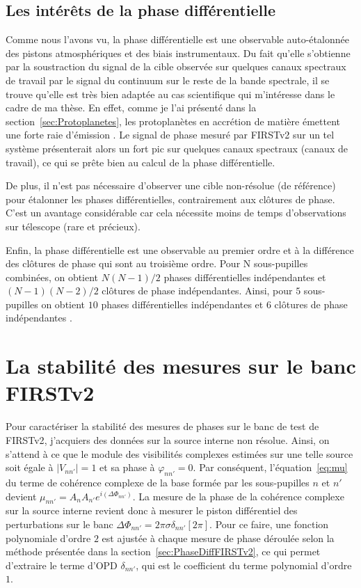 \subsection{Les intérêts de la phase différentielle}

Comme nous l'avons vu, la phase différentielle est une observable auto-étalonnée des pistons atmosphériques et des biais instrumentaux. Du fait qu'elle s'obtienne par la soustraction du signal de la cible observée sur quelques canaux spectraux de travail par le signal du continuum sur le reste de la bande spectrale, il se trouve qu'elle est très bien adaptée au cas scientifique qui m'intéresse dans le cadre de ma thèse. En effet, comme je l'ai présenté dans la section~\ref{sec:Protoplanetes}, les protoplanètes en accrétion de matière émettent une forte raie d'émission \ha. Le signal de phase mesuré par \ac{FIRSTv2} sur un tel système présenterait alors un fort pic sur quelques canaux spectraux (canaux de travail), ce qui se prête bien au calcul de la phase différentielle.

De plus, il n'est pas nécessaire d'observer une cible non-résolue (de référence) pour étalonner les phases différentielles, contrairement aux clôtures de phase. C'est un avantage considérable car cela nécessite moins de temps d'observations sur télescope (rare et précieux).

Enfin, la phase différentielle est une observable au premier ordre et à la différence des clôtures de phase qui sont au troisième ordre. Pour N sous-pupilles combinées, on obtient $N(N-1)/2$ phases différentielles indépendantes et $(N-1)(N-2)/2$ clôtures de phase indépendantes. Ainsi, pour $5$ sous-pupilles on obtient $10$ phases différentielles indépendantes et $6$ clôtures de phase indépendantes \citep{millour2006}.


\section{La stabilité des mesures sur le banc FIRSTv2}
\label{sec:CPStabilityMeudon}

Pour caractériser la stabilité des mesures de phases sur le banc de test de \ac{FIRSTv2}, j'acquiers des données sur la source interne non résolue. Ainsi, on s'attend à ce que le module des visibilités complexes estimées sur une telle source soit égale à $|V_{nn'}| = 1$ et sa phase à $\varphi_{nn'} = 0$. Par conséquent, l'équation~\ref{eq:mu} du terme de cohérence complexe de la base formée par les sous-pupilles $n$ et $n'$ devient $\mu_{nn'} = A_n A_{n'} e^{i(\Delta\Phi_{nn'})}$. La mesure de la phase de la cohérence complexe sur la source interne revient donc à mesurer le piston différentiel des perturbations sur le banc $\Delta\Phi_{nn'} = 2 \pi \sigma \delta_{nn'} [2 \pi]$. Pour ce faire, une fonction polynomiale d'ordre $2$ est ajustée à chaque mesure de phase déroulée selon la méthode présentée dans la section~\ref{sec:PhaseDiffFIRSTv2}, ce qui permet d'extraire le terme d'\ac{OPD} $\delta_{nn'}$, qui est le coefficient du terme polynomial d'ordre $1$.

